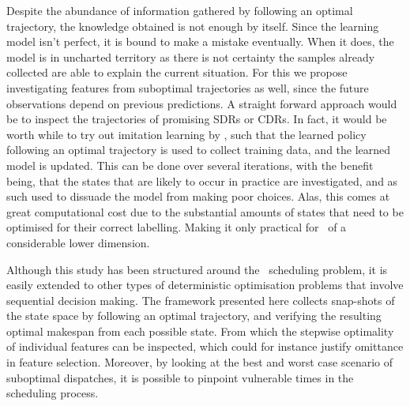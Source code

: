 \documentclass[smallextended]{svjour3}
\begin{document}
Despite the abundance of information gathered by following an optimal 
trajectory, the knowledge obtained is not enough by itself. Since the learning 
model isn't perfect, it is bound to make a mistake eventually. When it does, 
the model is in uncharted  territory as there is not certainty the samples 
already collected are able to explain the current situation. For this we 
propose investigating features from suboptimal trajectories as well, since the 
future observations depend on previous predictions. 
A straight forward approach would be to inspect 
the trajectories of promising SDRs or CDRs. 
In fact, it would be worth while to try out imitation learning by 
\cite{RossB10,RossGB11}, such that the learned policy following an optimal 
trajectory is used to collect training data, and the learned model is updated. 
This can be done over several iterations, with the benefit being, that the 
states that are likely to occur in practice are investigated, and as such used 
to dissuade the model from making poor choices. Alas, this comes at great 
computational cost due to the substantial amounts of states that need to be 
optimised for their correct labelling. Making it only practical for \jsp\ of 
a considerable lower dimension. 

Although this study has been structured around the \jsp\ scheduling problem, 
it is easily extended to other types of deterministic optimisation problems 
that involve sequential decision making. 
The framework presented here collects snap-shots of the state space by 
following an optimal trajectory, and verifying the resulting optimal makespan 
from each possible state. 
From which the stepwise optimality of individual features can be inspected, 
which could for instance justify omittance in feature selection. 
Moreover, by looking at the best and worst case scenario of suboptimal 
dispatches, it is possible to pinpoint vulnerable times in the scheduling 
process. 

  

\end{document}
